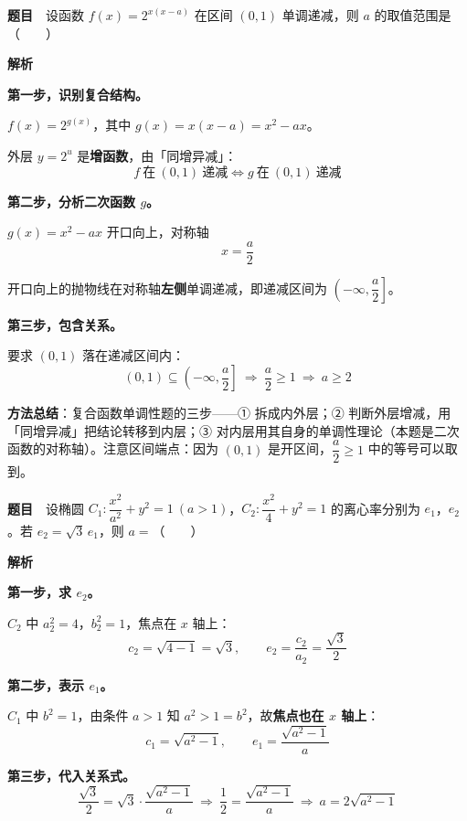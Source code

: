 \par\medskip


\textbf{题目}　设函数 $f(x)=2^{x(x-a)}$ 在区间 $(0,1)$ 单调递减，则 $a$ 的取值范围是（　　）

\textbf{解析}

\textbf{第一步，识别复合结构。}

$f(x)=2^{g(x)}$，其中 $g(x)=x(x-a)=x^{2}-ax$。

外层 $y=2^{u}$ 是\textbf{增函数}，由「同增异减」：
\[f\ \text{在}\ (0,1)\ \text{递减}\iff g\ \text{在}\ (0,1)\ \text{递减}\]

\textbf{第二步，分析二次函数 $g$。}

$g(x)=x^{2}-ax$ 开口向上，对称轴
\[x=\frac a2\]

开口向上的抛物线在对称轴\textbf{左侧}单调递减，即递减区间为 $\left(-\infty,\dfrac a2\right]$。

\textbf{第三步，包含关系。}

要求 $(0,1)$ 落在递减区间内：
\[(0,1)\subseteq\left(-\infty,\frac a2\right]\ \Longrightarrow\ \frac a2\ge1\ \Longrightarrow\ a\ge2\]


\begin{gktip}
\textbf{方法总结}：复合函数单调性题的三步——① 拆成内外层；② 判断外层增减，用「同增异减」把结论转移到内层；③ 对内层用其自身的单调性理论（本题是二次函数的对称轴）。注意区间端点：因为 $(0,1)$ 是开区间，$\dfrac a2\ge1$ 中的等号可以取到。
\end{gktip}

\par\medskip


\textbf{题目}　设椭圆 $C_1:\dfrac{x^{2}}{a^{2}}+y^{2}=1\ (a>1)$，$C_2:\dfrac{x^{2}}4+y^{2}=1$ 的离心率分别为 $e_1$，$e_2$。若 $e_2=\sqrt3\,e_1$，则 $a=$（　　）

\textbf{解析}

\textbf{第一步，求 $e_2$。}

$C_2$ 中 $a_2^{2}=4$，$b_2^{2}=1$，焦点在 $x$ 轴上：
\[c_2=\sqrt{4-1}=\sqrt3,\qquad e_2=\frac{c_2}{a_2}=\frac{\sqrt3}2\]

\textbf{第二步，表示 $e_1$。}

$C_1$ 中 $b^{2}=1$，由条件 $a>1$ 知 $a^{2}>1=b^{2}$，故\textbf{焦点也在 $x$ 轴上}：
\[c_1=\sqrt{a^{2}-1},\qquad e_1=\frac{\sqrt{a^{2}-1}}a\]

\textbf{第三步，代入关系式。}
\[\frac{\sqrt3}2=\sqrt3\cdot\frac{\sqrt{a^{2}-1}}a\ \Longrightarrow\ \frac12=\frac{\sqrt{a^{2}-1}}a\ \Longrightarrow\ a=2\sqrt{a^{2}-1}\]

